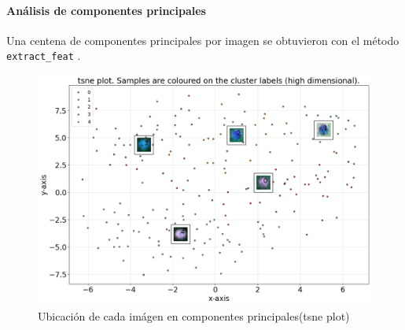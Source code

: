 \documentclass{article}
\begin{document}

\paragraph{Análisis de componentes principales}
Una centena de componentes principales por imagen se obtuvieron con el método \verb'extract_feat' \cite{taskesen_pca_2020}.





\begin{figure}
  \centering
  \includegraphics[width= 0.8\linewidth]{tsne}
  \caption{Ubicación de cada imágen en componentes principales(tsne plot)}
	\label{fg:tnse}
\end{figure}


\printbibliography[title= Referencias, heading=bibintoc]
\end{document}

